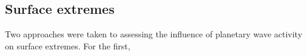 \subsection{Surface extremes}

Two approaches were taken to assessing the influence of planetary wave activity on surface extremes. For the first, 


